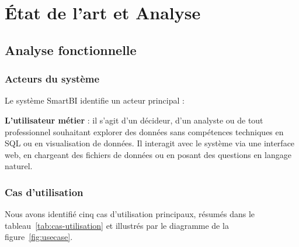 \chapter{État de l'art et Analyse}

\section{Analyse fonctionnelle}

\subsection{Acteurs du système}

Le système SmartBI identifie un acteur principal :

\textbf{L'utilisateur métier} : il s'agit d'un décideur, d'un analyste ou de tout professionnel souhaitant explorer des données sans compétences techniques en SQL ou en visualisation de données. Il interagit avec le système via une interface web, en chargeant des fichiers de données ou en posant des questions en langage naturel.

\subsection{Cas d'utilisation}

Nous avons identifié cinq cas d'utilisation principaux, résumés dans le tableau~\ref{tab:cas-utilisation} et illustrés par le diagramme de la figure~\ref{fig:usecase}.

